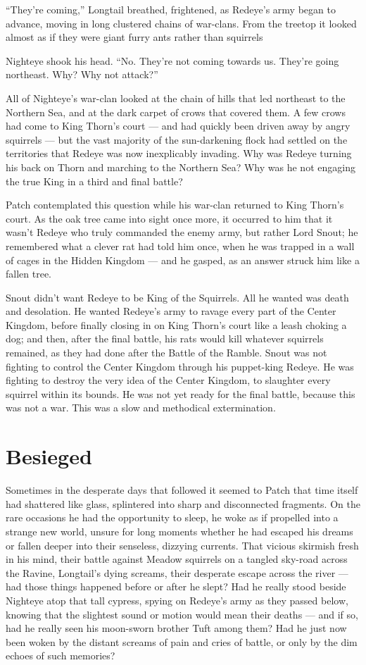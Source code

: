 \documentclass[ebook,oneside,openany,12pt]{memoir}
\begin{document}
“They’re coming,” Longtail breathed, frightened, as Redeye’s army
began to advance, moving in long clustered chains of war-clans. From
the treetop it looked almost as if they were giant furry ants rather
than squirrels

Nighteye shook his head. “No. They’re not coming towards us. They’re
going northeast. Why? Why not attack?”

All of Nighteye’s war-clan looked at the chain of hills that led
northeast to the Northern Sea, and at the dark carpet of crows that
covered them. A few crows had come to King Thorn’s court — and had
quickly been driven away by angry squirrels — but the vast majority of
the sun-darkening flock had settled on the territories that Redeye was
now inexplicably invading. Why was Redeye turning his back on Thorn
and marching to the Northern Sea? Why was he not engaging the true
King in a third and final battle?

Patch contemplated this question while his war-clan returned to King
Thorn’s court. As the oak tree came into sight once more, it occurred
to him that it wasn’t Redeye who truly commanded the enemy army, but
rather Lord Snout; he remembered what a clever rat had told him once,
when he was trapped in a wall of cages in the Hidden Kingdom — and he
gasped, as an answer struck him like a fallen tree.

Snout didn’t want Redeye to be King of the Squirrels. All he wanted
was death and desolation. He wanted Redeye’s army to ravage every part
of the Center Kingdom, before finally closing in on King Thorn’s court
like a leash choking a dog; and then, after the final battle, his rats
would kill whatever squirrels remained, as they had done after the
Battle of the Ramble. Snout was not fighting to control the Center
Kingdom through his puppet-king Redeye. He was fighting to destroy the
very idea of the Center Kingdom, to slaughter every squirrel within
its bounds. He was not yet ready for the final battle, because this
was not a war. This was a slow and methodical extermination.


\section{Besieged}

Sometimes in the desperate days that followed it seemed to Patch that
time itself had shattered like glass, splintered into sharp and
disconnected fragments. On the rare occasions he had the opportunity
to sleep, he woke as if propelled into a strange new world, unsure for
long moments whether he had escaped his dreams or fallen deeper into
their senseless, dizzying currents. That vicious skirmish fresh in his
mind, their battle against Meadow squirrels on a tangled sky-road
across the Ravine, Longtail’s dying screams, their desperate escape
across the river — had those things happened before or after he slept?
Had he really stood beside Nighteye atop that tall cypress, spying on
Redeye’s army as they passed below, knowing that the slightest sound
or motion would mean their deaths — and if so, had he really seen his
moon-sworn brother Tuft among them? Had he just now been woken by the
distant screams of pain and cries of battle, or only by the dim echoes
of such memories?
\end{document}
